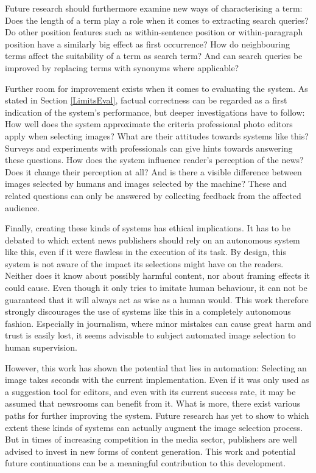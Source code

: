 \documentclass[11pt,a4paper,twoside]{article}
\begin{document}
Future research should furthermore examine new ways of characterising a term: Does the length of a term play a role when it comes to extracting search queries? Do other position features such as within-sentence position or within-paragraph position have a similarly big effect as first occurrence? How do neighbouring terms affect the suitability of a term as search term? And can search queries be improved by replacing terms with synonyms where applicable?

Further room for improvement exists when it comes to evaluating the system. As stated in Section \ref{LimitsEval}, factual correctness can be regarded as a first indication of the system's performance, but deeper investigations have to follow: How well does the system approximate the criteria professional photo editors apply when selecting images? What are their attitudes towards systems like this? Surveys and experiments with professionals can give hints towards answering these questions. How does the system influence reader's perception of the news? Does it change their perception at all? And is there a visible difference between images selected by humans and images selected by the machine? These and related questions can only be answered by collecting feedback from the affected audience.

Finally, creating these kinds of systems has ethical implications. It has to be debated to which extent news publishers should rely on an autonomous system like this, even if it were flawless in the execution of its task. By design, this system is not aware of the impact its selections might have on the readers. Neither does it know about possibly harmful content, nor about framing effects it could cause. Even though it only tries to imitate human behaviour, it can not be guaranteed that it will always act as wise as a human would. This work therefore strongly discourages the use of systems like this in a completely autonomous fashion. Especially in journalism, where minor mistakes can cause great harm and trust is easily lost, it seems advisable to subject automated image selection to human supervision.

\bigskip

However, this work has shown the potential that lies in automation: Selecting an image takes seconds with the current implementation. Even if it was only used as a suggestion tool for editors, and even with its current success rate, it may be assumed that newsrooms can benefit from it. What is more, there exist various paths for further improving the system. Future research has yet to show to which extent these kinds of systems can actually augment the image selection process. But in times of increasing competition in the media sector, publishers are well advised to invest in new forms of content generation. This work and potential future continuations can be a meaningful contribution to this development.
\end{document}
